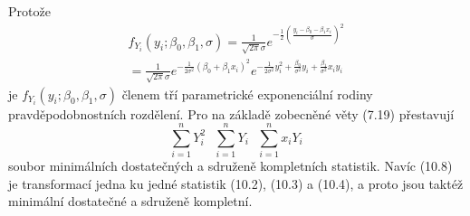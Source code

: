 Protože
\begin{multline*}
f_{Y_i}(y_i; \beta_0, \beta_1, \sigma) = \frac{1}{\sqrt{2 \pi}\sigma} e^{-\frac{1}{2}\left(\frac{y_i - \beta_0 - \beta_1x_i}{\sigma}\right)^2}\\
= \frac{1}{\sqrt{2 \pi} \sigma}e^{-\frac{1}{2 \sigma^2}(\beta_0 + \beta_1x_i)^2}e^{-\frac{1}{2 \sigma^2}y_i^2 + \frac{\beta_0}{\sigma^2}y_i + \frac{\beta_1}{\sigma^2}x_i y_i}
\end{multline*}
je $f_{Y_i}(y_i; \beta_0, \beta_1, \sigma)$ členem tří parametrické exponenciální rodiny pravděpodobnostních rozdělení. Pro na základě zobecněné věty (7.19) přestavují
\begin{equation}
\sum_{i = 1}^n Y_i^2 ~~~ \sum_{i = 1}^n Y_i ~~~ \sum_{i = 1}^n x_i Y_i
\end{equation}
soubor minimálních dostatečných a sdruženě kompletních statistik. Navíc (10.8) je transformací jedna ku jedné statistik (10.2), (10.3) a (10.4), a proto jsou taktéž minimální dostatečné a sdruženě kompletní.

